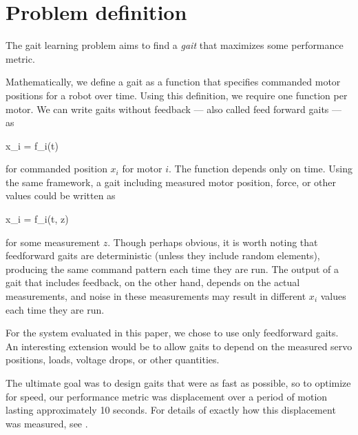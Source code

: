 \section{Problem definition}
%
%
%
%
%


The gait learning problem aims to find a \emph{gait} that maximizes
some performance metric.

Mathematically, we define a gait as a function that specifies
commanded motor positions for a robot over time.  Using this
definition, we require one function per motor.  We can write gaits
without feedback --- also called feed forward gaits --- as

\be
x_i = f_i(t)
\ee

\noindent for commanded position $x_i$ for motor $i$.  The
function depends only on time.  Using the same framework, a gait
including measured motor position, force, or other values could be
written as

\be
x_i = f_i(t, z)
\ee

\noindent for some measurement $z$.  Though perhaps obvious, it is
worth noting that feedforward gaits are deterministic (unless they
include random elements), producing the same command pattern each time
they are run.  The output of a gait that includes feedback, on the
other hand, depends on the actual measurements, and noise in these
measurements may result in different $x_i$ values each time they are
run.

For the system evaluated in this paper, we chose to use only
feedforward gaits.  An interesting extension would be to allow gaits
to depend on the measured servo positions, loads, voltage drops, or
other quantities.

The ultimate goal was to design gaits that were as fast as possible,
so to optimize for speed, our performance metric was displacement over
a period of motion lasting approximately 10 seconds.  For details of
exactly how this displacement was measured, see
.
